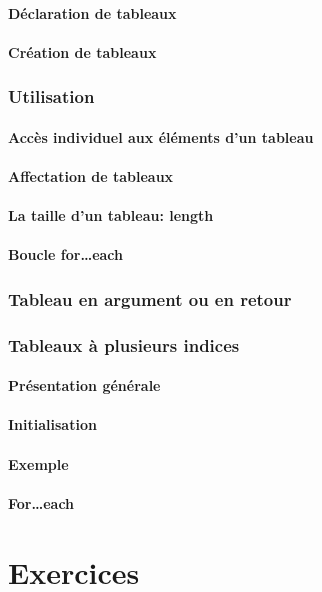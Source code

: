 \documentclass{beamer}
\begin{document}
        \subsection{Déclaration de tableaux}\label{subsec:declaration-de-tableaux}
            
        \subsection{Création de tableaux}\label{subsec:creation-de-tableaux}
            

    \section{Utilisation}
        \subsection{Accès individuel aux éléments d'un tableau}\label{subsec:acces-individuel-aux-elements-dun-tableau}
        \subsection{Affectation de tableaux}\label{subsec:affectation-de-tableaux}
        \subsection{La taille d'un tableau: length}\label{subsec:la-taille-dun-tableau}
        \subsection{Boucle for\ldots each}\label{subsec:boucle-foreach}

    \section{Tableau en argument ou en retour}\label{sec:tableau-en-argument-ou-en-retour}

    \section{Tableaux à plusieurs indices}\label{sec:tableaux-a-plusieurs-indices}
        \subsection{Présentation générale}\label{subsec:presentation-generale}
        \subsection{Initialisation}\label{subsec:initialisation}
        \subsection{Exemple}\label{subsec:exemple}
        \subsection{For\ldots each}\label{subsec:for-each}

    \part{Exercices}
    \frame{\partpage}
\end{document}
